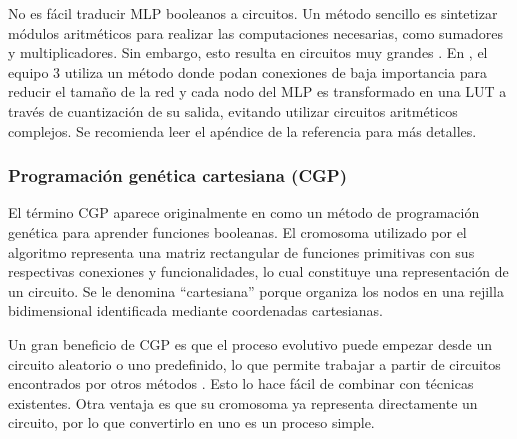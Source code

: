 No es fácil traducir MLP booleanos a circuitos. Un método sencillo es
sintetizar módulos aritméticos para realizar las computaciones necesarias, como
sumadores y multiplicadores. Sin embargo, esto resulta en circuitos muy grandes
\cite{miyasaka_logic_2021}. En \cite{rai_logic_2021}, el equipo 3 utiliza un
método donde podan conexiones de baja importancia para reducir el tamaño de la
red y cada nodo del MLP es transformado en una LUT a través de cuantización de
su salida, evitando utilizar circuitos aritméticos complejos. Se recomienda
leer el apéndice de la referencia para más detalles.

\subsubsection{Programación genética cartesiana (CGP)}

El término CGP aparece originalmente en \cite{miller_empirical_1999} como un
método de programación genética para aprender funciones booleanas. El cromosoma
utilizado por el algoritmo representa una matriz rectangular de funciones
primitivas con sus respectivas conexiones y funcionalidades, lo cual constituye
una representación de un circuito. Se le denomina ``cartesiana'' porque
organiza los nodos en una rejilla bidimensional identificada mediante
coordenadas cartesianas.

Un gran beneficio de CGP es que el proceso evolutivo puede empezar desde un
circuito aleatorio o uno predefinido, lo que permite trabajar a partir de
circuitos encontrados por otros métodos \cite{berndt_cgp-based_2022}. Esto lo
hace fácil de combinar con técnicas existentes. Otra ventaja es que su
cromosoma ya representa directamente un circuito, por lo que convertirlo en uno
es un proceso simple.
